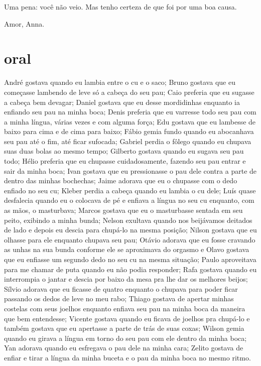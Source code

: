 Uma pena: você não veio. Mas tenho certeza de que foi por uma boa causa.



 \begin{flushright}Amor, Anna.\end{flushright}


\chapter{ oral }

André gostava quando eu lambia entre o cu e o saco; Bruno gostava que eu
começasse lambendo de leve só a cabeça do seu pau; Caio preferia que eu
sugasse a cabeça bem devagar; Daniel gostava que eu desse mordidinhas
enquanto ia enfiando seu pau na minha boca; Denis preferia que eu
varresse todo seu pau com a minha língua, várias vezes e com alguma
força; Edu gostava que eu lambesse de baixo para cima e de cima para
baixo; Fábio gemia fundo quando eu abocanhava seu pau até o fim, até
ficar sufocada; Gabriel perdia o fôlego quando eu chupava suas duas
bolas ao mesmo tempo; Gilberto gostava quando eu sugava seu pau todo;
Hélio preferia que eu chupasse cuidadosamente, fazendo seu pau entrar e
sair da minha boca; Ivan gostava que eu pressionasse o pau dele contra a
parte de dentro das minhas bochechas; Jaime adorava que eu o chupasse
com o dedo enfiado no seu cu; Kleber perdia a cabeça quando eu lambia o
cu dele; Luís quase desfalecia quando eu o colocava de pé e enfiava a
língua no seu cu enquanto, com as mãos, o masturbava; Marcos gostava que
eu o masturbasse sentada em seu peito, exibindo a minha bunda; Nelson
exultava quando nos beijávamos deitados de lado e depois eu descia para
chupá-lo na mesma posição; Nilson gostava que eu olhasse para ele
enquanto chupava seu pau; Otávio adorava que eu fosse cravando as unhas
na sua bunda conforme ele se aproximava do orgasmo e Olavo gostava que
eu enfiasse um segundo dedo no seu cu na mesma situação; Paulo
aproveitava para me chamar de puta quando eu não podia responder; Rafa
gostava quando eu interrompia o jantar e descia por baixo da mesa pra
lhe dar os melhores beijos; Sílvio adorava que eu ficasse de quatro
enquanto o chupava para poder ficar passando os dedos de leve no meu
rabo; Thiago gostava de apertar minhas costelas com seus joelhos
enquanto enfiava seu pau na minha boca da maneira que bem entendesse;
Vicente gostava quando eu ficava de joelhos pra chupá-lo e também
gostava que eu apertasse a parte de trás de suas coxas; Wilson gemia
quando eu girava a língua em torno do seu pau com ele dentro da minha
boca; Yan adorava quando eu esfregava o pau dele na minha cara; Zelito
gostava de enfiar e tirar a língua da minha buceta e o pau da minha boca
no mesmo ritmo.

